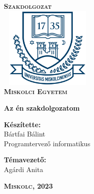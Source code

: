 \begin{titlepage}
\centering
\vspace*{2cm}
\huge\textsc{\textbf{Szakdolgozat}}\\[1cm]
\includegraphics[width=4.8cm, height=4cm,keepaspectratio]{images/me_logo.png}\\
\textbf{\textsc{Miskolci Egyetem}}

\vspace*{2cm}

{\LARGE\textbf{Az én szakdolgozatom}}

\vspace*{2cm}
\large
\textbf{Készítette:}\\[0.8ex]
Bártfai Bálint\\[0.8ex]
Programtervező informatikus

\vspace*{0.5cm}
\textbf{Témavezető:}\\[0.8ex]
Agárdi Anita

\vfill

\large
\textbf{\textsc{Miskolc, 2023}}

\end{titlepage}